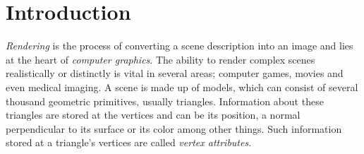


\chapter{Introduction}




\textit{Rendering} is the process of converting a scene description into an
image and lies at the heart of \textit{computer graphics}. The ability to render
complex scenes realistically or distinctly is vital in several areas; computer
games, movies and even medical imaging. A scene is made up of models, which can
consist of several thousand geometric primitives, usually triangles. Information about these triangles are stored at
the vertices and can be its position, a normal perpendicular to its surface or
its color among other things. Such information stored at a triangle's vertices
are called \textit{vertex attributes}.



